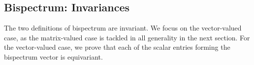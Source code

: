\documentclass{article}
\begin{document}




\subsection{Bispectrum: Invariances}

The two definitions of bispectrum are invariant. We focus on the vector-valued case, as the matrix-valued case is tackled in all generality in the next section. For the vector-valued case, we prove that each of the scalar entries forming the bispectrum vector is equivariant.
\end{document}
